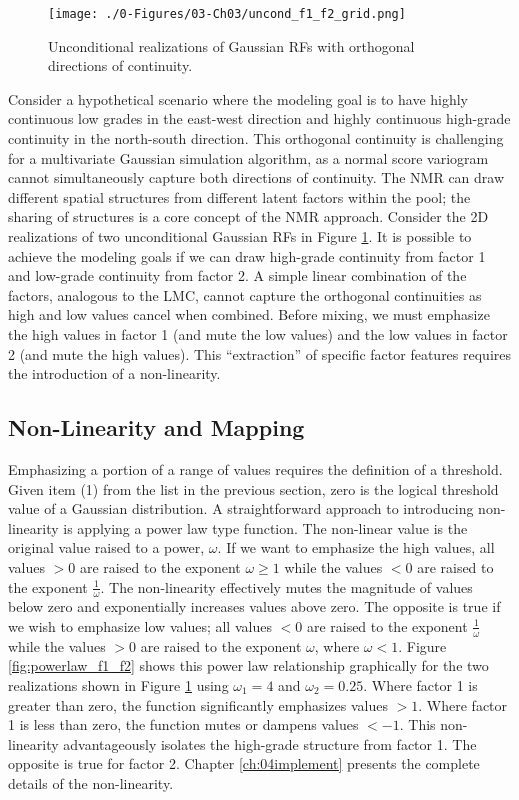 \begin{figure}[htb!]
    \centering
    \texttt{[image: ./0-Figures/03-Ch03/uncond\_f1\_f2\_grid.png]}
    \caption{Unconditional realizations of Gaussian \glspl{RF} with orthogonal directions of continuity.}
    \label{fig:uncond_f1_f2_grid}
\end{figure}

Consider a hypothetical scenario where the modeling goal is to have highly continuous low grades in the east-west direction and highly continuous high-grade continuity in the north-south direction. This orthogonal continuity is challenging for a multivariate Gaussian simulation algorithm, as a normal score variogram cannot simultaneously capture both directions of continuity. The \gls{NMR} can draw different spatial structures from different latent factors within the pool; the sharing of structures is a core concept of the \gls{NMR} approach. Consider the \gls{2D} realizations of two unconditional Gaussian \glspl{RF} in Figure \ref{fig:uncond_f1_f2_grid}. It is possible to achieve the modeling goals if we can draw high-grade continuity from factor 1 and low-grade continuity from factor 2. A simple linear combination of the factors, analogous to the \gls{LMC}, cannot capture the orthogonal continuities as high and low values cancel when combined. Before mixing, we must emphasize the high values in factor 1 (and mute the low values) and the low values in factor 2 (and mute the high values). This ``extraction'' of specific factor features requires the introduction of a non-linearity.


\FloatBarrier
\subsection{Non-Linearity and Mapping}
\label{subsec:03nonlinear}

Emphasizing a portion of a range of values requires the definition of a threshold. Given item (1) from the list in the previous section, zero is the logical threshold value of a Gaussian distribution. A straightforward approach to introducing non-linearity is applying a power law type function. The non-linear value is the original value raised to a power, $\omega$. If we want to emphasize the high values, all values $> 0$ are raised to the exponent $\omega \geq 1$ while the values $< 0$ are raised to the exponent $\frac{1}{\omega}$. The non-linearity effectively mutes the magnitude of values below zero and exponentially increases values above zero. The opposite is true if we wish to emphasize low values; all values $< 0$ are raised to the exponent $\frac{1}{\omega}$ while the values $> 0$ are raised to the exponent $\omega$, where $\omega < 1$. Figure \ref{fig:powerlaw_f1_f2} shows this power law relationship graphically for the two realizations shown in Figure \ref{fig:uncond_f1_f2_grid} using $\omega_{1}=4$ and $\omega_{2}=0.25$. Where factor 1 is greater than zero, the function significantly emphasizes values $> 1$. Where factor 1 is less than zero, the function mutes or dampens values $< -1$. This non-linearity advantageously isolates the high-grade structure from factor 1. The opposite is true for factor 2. Chapter \ref{ch:04implement} presents the complete details of the non-linearity.

